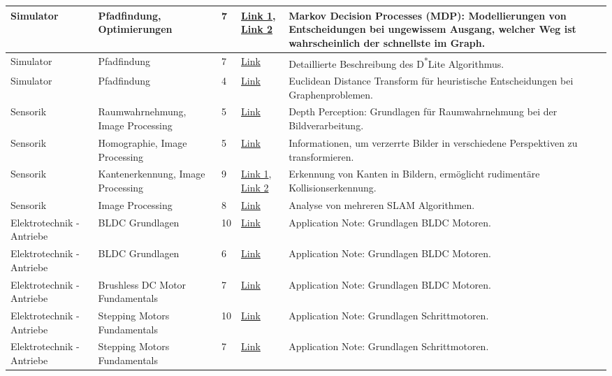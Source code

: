 \documentclass[../main.tex]{subfiles}
\begin{document}
\begin{longtable}{@{} L{2.5cm} L{2.9cm} C{1cm} L{1.2cm} L{6cm} @{}}
Simulator & Pfadfindung, Optimierungen & 7 & \href{https://ai.dmi.unibas.ch/\_files/teaching/hs21/po/slides/po-f01.pdf}{Link 1}, \href{https://www.math.leidenuniv.nl/\~{}kallenberglcm/Lecture-notes-MDP.pdf}{Link 2} & Markov Decision Processes (MDP): Modellierungen von Entscheidungen bei ungewissem Ausgang, welcher Weg ist wahrscheinlich der schnellste im Graph. \\
\hline
Simulator & Pfadfindung & 7 & \href{https://idm-lab.org/bib/abstracts/papers/aaai02b.pdf}{Link} & Detaillierte Beschreibung des D\textsuperscript{*}Lite Algorithmus. \\
\hline
Simulator & Pfadfindung & 4 & \href{http://sibgrapi.sid.inpe.br/col/sid.inpe.br/banon/2002/11.13.11.53/doc/269-275.pdf}{Link} & Euclidean Distance Transform für heuristische Entscheidungen bei Graphenproblemen. \\
\hline
Sensorik & Raumwahrnehmung, Image Processing & 5 & \href{http://www.robotics.stanford.edu/\~{}ang/papers/aaai08-Make3dDepthPerceptionSingleImage.pdf}{Link} & Depth Perception: Grundlagen für Raumwahrnehmung bei der Bildverarbeitung. \\
\hline
Sensorik & Homographie, Image Processing & 5 & \href{https://docs.opencv.org/4.x/d9/dab/tutorial\_homography.html}{Link} & Informationen, um verzerrte Bilder in verschiedene Perspektiven zu transformieren. \\
\hline
Sensorik & Kantenerkennung, Image Processing & 9 & \href{https://docs.opencv.org/4.x/da/d22/tutorial\_py\_canny.html}{Link 1}, \href{https://iopscience.iop.org/article/10.1088/1757-899X/1096/1/012079/pdf}{Link 2} & Erkennung von Kanten in Bildern, ermöglicht rudimentäre Kollisionserkennung. \\
\hline
Sensorik & Image Processing & 8 & \href{https://hal.science/hal-04132827/document}{Link} & Analyse von mehreren SLAM Algorithmen. \\
\hline
Elektrotechnik - Antriebe & BLDC Grundlagen & 10 & \href{https://www.microchip.com/en-us/application-notes/an885}{Link} & Application Note: Grundlagen BLDC Motoren. \\
\hline
Elektrotechnik - Antriebe & BLDC Grundlagen & 6 & \href{https://www.silabs.com/documents/public/application-notes/an0816-efm32-brushless-dc-motor-control.pdf}{Link} & Application Note: Grundlagen BLDC Motoren. \\
\hline
Elektrotechnik - Antriebe & Brushless DC Motor Fundamentals & 7 & \href{https://media.monolithicpower.com/document/Brushless\_DC\_Motor\_Fundamentals.pdf}{Link} & Application Note: Grundlagen BLDC Motoren. \\
\hline
Elektrotechnik - Antriebe & Stepping Motors Fundamentals & 10 & \href{https://www.microchip.com/en-us/application-notes/an907}{Link} & Application Note: Grundlagen Schrittmotoren. \\
\hline
Elektrotechnik - Antriebe & Stepping Motors Fundamentals & 7 & \href{https://download.beckhoff.com/download/document/application\_notes/dk9222-0410-0014.pdf}{Link} & Application Note: Grundlagen Schrittmotoren. \\


\end{longtable}
\end{document}
